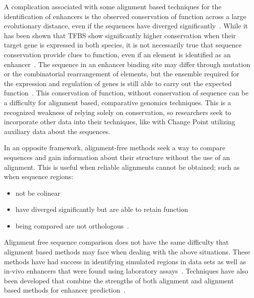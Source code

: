          A complication associated with some alignment based techniques for the identification of enhancers is the observed conservation of function across a large evolutionary distance, even if the sequences have diverged significantly~\cite{tautz2000evolution, pennacchio2013enhancers}. While it has been shown that TFBS show significantly higher conservation when their target gene is expressed in both species, it is not necessarily true that sequence conservation provide clues to function, even if an element is identified as an enhancer~\cite{hemberg2011conservation, pennacchio2013enhancers}.
         The sequence in an enhancer binding site may differ through mutation or the combinatorial rearrangement of elements, but the ensemble required for the expression and regulation of genes is still able to carry out the expected function~\cite{wong2014decoupling}. This conservation of function, without conservation of sequence can be a difficulty for alignment based, comparative genomics techniques. This is a recognized weakness of relying solely on conservation, so researchers seek to incorporate other data into their techniques, like with Change Point utilizing auxiliary data about the sequences. 
        
        In an opposite framework, alignment-free methods seek a way to compare sequences and gain information about their structure without the use of an alignment. 
        This is useful when reliable alignments cannot be obtained; such as when sequence regions: 
            \begin{itemize}
                \item not be colinear %
                \item have diverged significantly but are able to retain function
                \item being compared are not orthologous~\cite{song2013new}.
            \end{itemize}
        Alignment free sequence comparison does not have the same difficulty that alignment based methods may face when dealing with the above situations. These methods have had success in identifying simulated regions in data sets as well as in-vivo enhancers that were found using laboratory assays~\cite{goke2012estimation}. Techniques have also been developed that combine the strengths of both alignment and alignment based methods for enhancer prediction~\cite{dolle2015handling}. 
        
